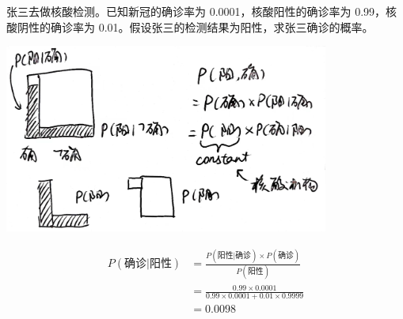\documentclass[UTF8]{ctexart}
\begin{document}
张三去做核酸检测。已知新冠的确诊率为 0.0001，核酸阳性的确诊率为 0.99，核酸阴性的确诊率为 0.01。假设张三的检测结果为阳性，求张三确诊的概率。

\begin{center}
	\includegraphics[width=0.8\textwidth]{fig7.jpg}
\end{center}

\begin{equation}
\begin{aligned}
	P(\text{确诊}|\text{阳性}) 
  & = \frac{P(\text{阳性}|\text{确诊}) \times P(\text{确诊})}{P(\text{阳性})}    \\
  & = \frac{0.99 \times 0.0001}{0.99 \times 0.0001 + 0.01 \times 0.9999} \\
  & = 0.0098
\end{aligned}
\end{equation}
\end{document}
